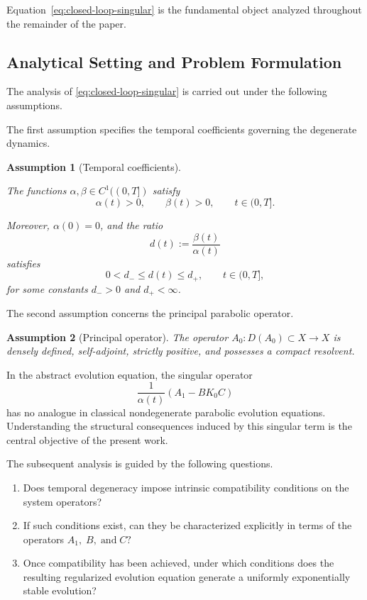 \documentclass[pdflatex,sn-mathphys-num]{sn-jnl}
\theoremstyle{thmstyleone}%
\theoremstyle{thmstyletwo}%
\theoremstyle{thmstylethree}%
\newtheorem{assumption}{Assumption}
\begin{document}
Equation~\eqref{eq:closed-loop-singular} is the fundamental object analyzed throughout the remainder of the paper.

\subsection{Analytical Setting and Problem Formulation}
\label{subsec:analytical-setting}

The analysis of \eqref{eq:closed-loop-singular} is carried out under the following assumptions.

The first assumption specifies the temporal coefficients governing the degenerate dynamics.

\begin{assumption}[Temporal coefficients]
\label{ass:time}

The functions \(\alpha,\beta\in C^{1}((0,T])\)
satisfy
\[
\alpha(t)>0,
\qquad
\beta(t)>0,
\qquad
t\in(0,T].
\]

Moreover,
\(\alpha(0)=0\),
and the ratio
\[
d(t):=\frac{\beta(t)}{\alpha(t)}
\]
satisfies
\begin{equation}
0<d_-\le d(t)\le d_+,
\qquad
t\in(0,T],
\label{eq:d-bounds}
\end{equation}
for some constants \(d_->0\) and \(d_+<\infty\).

\end{assumption}

The second assumption concerns the principal parabolic operator.

\begin{assumption}[Principal operator]
\label{ass:A0}
The operator \(A_0:D(A_0)\subset X\rightarrow X\) is densely defined, self-adjoint, strictly positive, and possesses a compact resolvent.
\end{assumption}

In the abstract evolution equation, the singular operator
\[
\frac{1}{\alpha(t)}
\left(
A_{1}-BK_{0}C
\right)
\]
has no analogue in classical nondegenerate parabolic evolution equations. Understanding the structural consequences induced by this singular term is the central objective of the present work.

The subsequent analysis is guided by the following questions.

\begin{enumerate}

\item
Does temporal degeneracy impose intrinsic compatibility conditions on the system operators?

\item
If such conditions exist, can they be characterized explicitly in terms of the operators \( A_{1},\; B,
\;\text{and}\; C? \)

\item
Once compatibility has been achieved, under which conditions does the resulting regularized evolution equation generate a uniformly exponentially stable evolution?

\end{enumerate}
\end{document}
